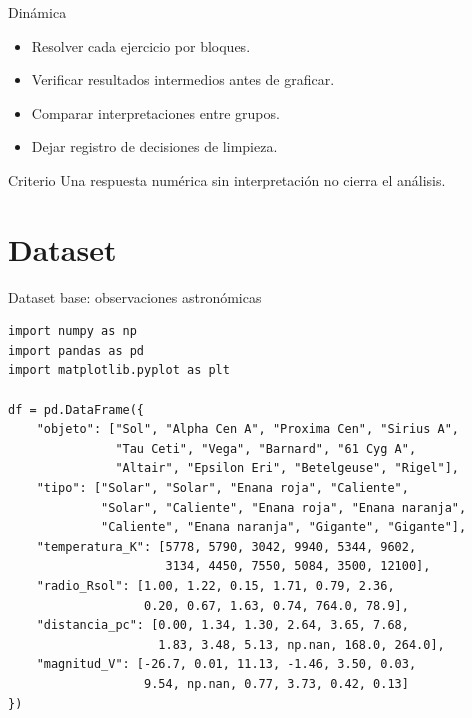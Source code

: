 \documentclass[10pt]{beamer}
\begin{document}
\begin{frame}{Dinámica}
  \begin{itemize}
    \item Resolver cada ejercicio por bloques.
    \item Verificar resultados intermedios antes de graficar.
    \item Comparar interpretaciones entre grupos.
    \item Dejar registro de decisiones de limpieza.
  \end{itemize}
  \begin{block}{Criterio}
    Una respuesta numérica sin interpretación no cierra el análisis.
  \end{block}
\end{frame}

\section{Dataset}

\begin{frame}[fragile,shrink=6]{Dataset base: observaciones astronómicas}
\begin{verbatim}
import numpy as np
import pandas as pd
import matplotlib.pyplot as plt

df = pd.DataFrame({
    "objeto": ["Sol", "Alpha Cen A", "Proxima Cen", "Sirius A",
               "Tau Ceti", "Vega", "Barnard", "61 Cyg A",
               "Altair", "Epsilon Eri", "Betelgeuse", "Rigel"],
    "tipo": ["Solar", "Solar", "Enana roja", "Caliente",
             "Solar", "Caliente", "Enana roja", "Enana naranja",
             "Caliente", "Enana naranja", "Gigante", "Gigante"],
    "temperatura_K": [5778, 5790, 3042, 9940, 5344, 9602,
                      3134, 4450, 7550, 5084, 3500, 12100],
    "radio_Rsol": [1.00, 1.22, 0.15, 1.71, 0.79, 2.36,
                   0.20, 0.67, 1.63, 0.74, 764.0, 78.9],
    "distancia_pc": [0.00, 1.34, 1.30, 2.64, 3.65, 7.68,
                     1.83, 3.48, 5.13, np.nan, 168.0, 264.0],
    "magnitud_V": [-26.7, 0.01, 11.13, -1.46, 3.50, 0.03,
                   9.54, np.nan, 0.77, 3.73, 0.42, 0.13]
})
\end{verbatim}
\end{frame}

\end{document}
